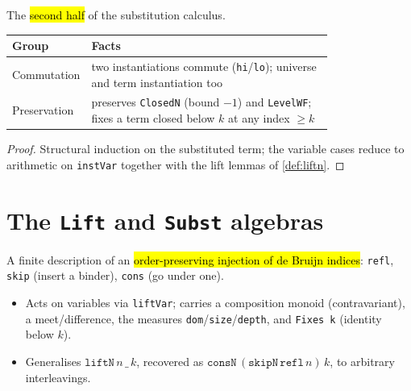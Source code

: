 \begin{lemma}
\label{fam:inst-inst}
\leanok
{}

 The \hl{second half} of the substitution calculus.
\par\smallskip\noindent
\begin{tabular}{lp{0.79\linewidth}}
\toprule
Group & Facts \\
\midrule
Commutation & two instantiations commute (\texttt{hi}/\texttt{lo}); universe and term
instantiation too \\
Preservation & preserves \texttt{ClosedN} (bound $-1$) and \texttt{LevelWF}; fixes a term
closed below $k$ at any index $\ge k$ \\
\bottomrule
\end{tabular}\par\smallskip
\end{lemma}
\begin{proof}
\leanok
{} Structural induction on the substituted term; the variable cases reduce to
arithmetic on \texttt{instVar} together with the lift lemmas of \ref{def:liftn}.
\end{proof}

\section{The \texttt{Lift} and \texttt{Subst} algebras}

\begin{definition}
\label{ind:lift}
\leanok
{}

 A finite description of an \hl{order-preserving injection of de Bruijn
indices}: \texttt{refl}, \texttt{skip} (insert a binder), \texttt{cons} (go under
one).
\begin{itemize}
\item Acts on variables via \texttt{liftVar}; carries a composition monoid
(contravariant), a meet/difference, the measures \texttt{dom}/\texttt{size}/\texttt{depth},
and \texttt{Fixes k} (identity below $k$).
\item Generalises $\texttt{liftN}\,n\,\_\,k$, recovered as
$\texttt{consN}\,(\texttt{skipN}\,\texttt{refl}\,n)\,k$, to arbitrary interleavings.
\end{itemize}
\end{definition}

